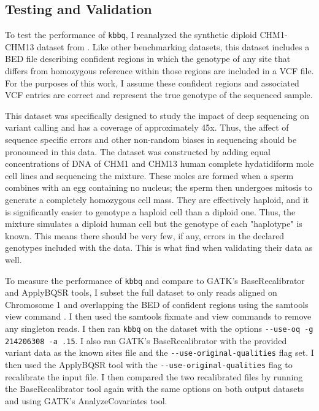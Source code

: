 \subsection{Testing and Validation}
To test the performance of \texttt{kbbq}, I reanalyzed the synthetic diploid CHM1-CHM13 dataset from \cite{li_synthetic-diploid_2018}. Like other benchmarking datasets, this dataset includes a BED file describing confident regions in which the genotype of any site that differs from homozygous reference within those regions are included in a VCF file. For the purposes of this work, I assume these confident regions and associated VCF entries are correct and represent the true genotype of the sequenced sample.

This dataset was specifically designed to study the impact of deep sequencing on variant calling and has a coverage of approximately 45x. Thus, the affect of sequence specific errors and other non-random biases in sequencing should be pronounced in this data.
The dataset was constructed by adding equal concentrations of DNA of CHM1 and CHM13 human complete hydatidiform mole cell lines and sequencing the mixture. These moles are formed when a sperm combines with an egg containing no nucleus; the sperm then undergoes mitosis to generate a completely homozygous cell mass. They are effectively haploid, and it is significantly easier to genotype a haploid cell than a diploid one. Thus, the mixture simulates a diploid human cell but the genotype of each "haplotype" is known. This means there should be very few, if any, errors in the declared genotypes included with the data. This is what \cite{li_synthetic-diploid_2018} find when validating their data as well.

To measure the performance of \texttt{kbbq} and compare to GATK's BaseRecalibrator and ApplyBQSR tools, I subset the full dataset to only reads aligned on Chromosome 1 and overlapping the BED of confident regions using the samtools view command \parencite{li_sequence_2009}. I then used the samtools fixmate and view commands to remove any singleton reads. I then ran \texttt{kbbq} on the dataset with the options \texttt{-\phantom{}-use-oq -g 214206308 -a .15}. I also ran GATK's BaseRecalibrator with the provided variant data as the known sites file and the \texttt{-\phantom{}-use-original-qualities} flag set. I then used the ApplyBQSR tool with the \texttt{-\phantom{}-use-original-qualities} flag to recalibrate the input file. I then compared the two recalibrated files by running the BaseRecalibrator tool again with the same options on both output datasets and using GATK's AnalyzeCovariates tool.

